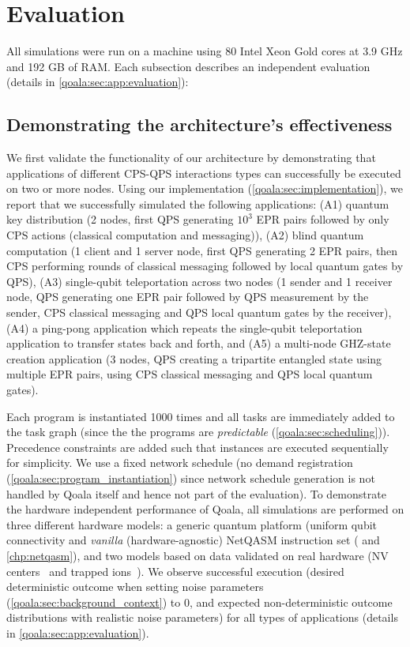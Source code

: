 \section{Evaluation}
\label{qoala:sec:evaluation}
All simulations were run on a machine using 80 Intel Xeon Gold cores at 3.9 GHz and 192 GB of RAM.
Each subsection describes an independent evaluation (details in \cref{qoala:sec:app:evaluation}):

\subsection{Demonstrating the architecture's effectiveness}
\label{qoala:sec:demonstrating_architecture_effectiveness}
We first validate the functionality of our architecture by demonstrating that applications of different CPS-QPS interactions types can successfully be executed on two or more nodes.
Using our implementation (\cref{qoala:sec:implementation}), we report that we successfully simulated the following applications:
(A1) quantum key distribution (2 nodes, first QPS generating $10^3$ EPR pairs followed by only CPS actions (classical computation and messaging)),
(A2) blind quantum computation (1 client and 1 server node, first QPS generating 2 EPR pairs, then CPS performing rounds of classical messaging followed by local quantum gates by QPS),
(A3) single-qubit teleportation across two nodes (1 sender and 1 receiver node, QPS generating one EPR pair followed by QPS measurement by the sender, CPS classical messaging and QPS local quantum gates by the receiver),
(A4) a ping-pong application which repeats the single-qubit teleportation application to transfer states back and forth,
and (A5) a multi-node GHZ-state~\cite{greenberger1989going} creation application (3 nodes, QPS creating a tripartite entangled state using multiple EPR pairs, using CPS classical messaging and QPS local quantum gates).

Each program is instantiated 1000 times and all tasks are immediately added to the task graph (since the the programs are \textit{predictable} (\cref{qoala:sec:scheduling})).
Precedence constraints are added such that instances are executed sequentially for simplicity.
We use a fixed network schedule (no demand registration (\cref{qoala:sec:program_instantiation}) since network schedule generation is not handled by Qoala itself and hence not part of the evaluation).
To demonstrate the hardware independent performance of Qoala, all simulations are performed on three different hardware models: a generic quantum platform (uniform qubit connectivity and \textit{vanilla} (hardware-agnostic) NetQASM instruction set (\cite{dahlberg2022netqasm} and \cref{chp:netqasm}),
and two models based on data validated on real hardware (NV centers~\cite{bradley2019ten, hermans2022qubit} and trapped ions~\cite{krutyanskiy2023entanglement}). 
We observe successful execution (desired deterministic outcome when setting noise parameters (\cref{qoala:sec:background_context}) to 0, and expected non-deterministic outcome distributions with realistic noise parameters) for all types of applications (details in \cref{qoala:sec:app:evaluation}).

